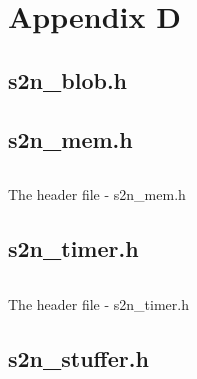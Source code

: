 \chapter{Appendix D} \label{app:s2nHeader}

\section{s2n\_blob.h}\label{appsec:s2nBlob}
\begin{listing}[ht]
\end{listing}

\section{s2n\_mem.h}\label{appsec:s2nMem}
\begin{listing}[ht]
\inputminted[frame=single, breaklines, linenos, numbersep=5pt, tabsize=4, firstline=22, fontsize=\footnotesize]{c}{./contents/code/headers/s2n_mem.h} %
\caption{The header file - s2n\_mem.h}
\end{listing}

\section{s2n\_timer.h}\label{appsec:s2nTimer}
\begin{listing}[ht]
\inputminted[frame=single, breaklines, linenos, numbersep=5pt, tabsize=4, firstline=20, fontsize=\footnotesize]{c}{./contents/code/headers/s2n_timer.h} %
\caption{The header file - s2n\_timer.h}
\end{listing}

\section{s2n\_stuffer.h}\label{appsec:s2nStuffer}
\inputminted[frame=single, breaklines, linenos, numbersep=5pt, tabsize=4, firstline=23, fontsize=\footnotesize]{c}{./contents/code/headers/s2n_stuffer.h} %

